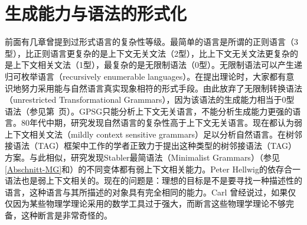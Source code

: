 
\chapter{生成能力与语法的形式化}
\label{sec-generative-capacity}

前面有几章曾提到过形式语言的复杂性等级。最简单的语言是所谓的正则语言（3型），比正则语言更复杂的是上下文无关文法（2型），比上下文无关文法更复杂的是上下文相关文法（1型），最复杂的是无限制语法（0型）。无限制语法可以产生递归可枚举语言（recursively enumerable languages）。在提出理论时，大家都有意识地努力采用能与自然语言真实现象相符的形式手段。由此放弃了无限制转换语法（unrestricted Transformational Grammars），因为该语法的生成能力相当于0型语法（参见第~\pageref{page-TG-Typ0}页）。GPSG只能分析上下文无关语言，不能分析生成能力更强的语言。80年代中期，研究发现自然语言的复杂性高于上下文无关语言\citep{Shieber85a,Culy85a}。现在都认为弱上下文相关文法（mildly context sensitive grammars）足以分析自然语言。在树邻接语法\indextag （TAG）框架中工作的学者正致力于提出这种类型的树邻接语法\indextag （TAG）方案。与此相似，研究发现Stabler最简语法（Minimalist Grammars）\indexmg （参见\ref{Abschnitt-MG}和\citet{Stabler2001a,Stabler2010b}）的不同变体都有弱上下文相关能力\citep{Michaelis2001a-u}。Peter Hellwig的依存合一语法也是弱上下文相关的\citep[]{Hellwig2003a}。现在的问题是：理想的目标是不是要寻找一种描述性的语言，这种语言与其所描述的对象具有完全相同的能力。Carl  \citet{Pollard96a}曾经说过，如果仅仅因为某些物理学理论采用的数学工具过于强大，而断言这些物理学理论不够完备，这种断言是非常奇怪的。
